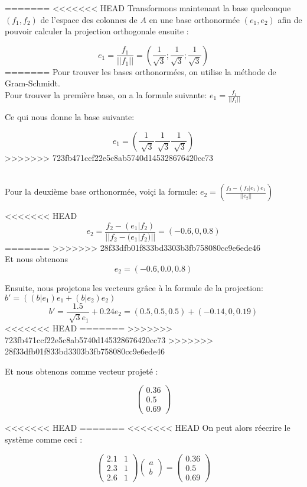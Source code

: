 =======
<<<<<<< HEAD
Transformons maintenant la base quelconque $(f_1, f_2)$ de l'espace des
colonnes de $A$ en une base orthonormée $(e_1, e_2)$ afin de pouvoir 
calculer la projection orthogonale ensuite :

$$e_1 = \frac{f_1}{||f_1||} = (\frac{1}{\sqrt{3}} ; \frac{1}{\sqrt{3}} ; \frac{1}{\sqrt{3}})$$
=======
Pour trouver les bases orthonormées, on utilise la méthode de Gram-Schmidt.
\\
Pour trouver la première base, on a la formule suivante: $e_1=\frac{f_1}{||f_1||}$

Ce qui nous donne la base suivante:

\[e_1=( \frac{1}{\sqrt[]{3}} \frac{1}{\sqrt[]{3}} \frac{1}{\sqrt[]{3}})\]
>>>>>>> 723fb471ccf22e5c8ab5740d145328676420cc73

\\ 
Pour la deuxième base orthonormée, voiçi la formule:  $e_2=(\frac{f_2-(f_2|e_1)e_1}{||e_2||})$

<<<<<<< HEAD
$$e_2 = \frac{f_2 - (e_1|f_2)}{||f_2 - (e_1|f_2)||} = (-0.6, 0, 0.8)$$
=======
>>>>>>> 28f33dfb01f833bd3303b3fb758080cc9e6ede46
\\Et nous obtenons
\[e_2=( -0.6, 0.0, 0.8)\]

\bigbreak
Ensuite, nous projetons les vecteurs grâce à la formule de la projection: $b'=((b|e_1)e_1+(b|e_2)e_2)$
\[b'=\frac{1.5}{\sqrt[]{3}e_1}+0.24e_2=(0.5,0.5,0.5)+(-0.14,0,0.19)\]
<<<<<<< HEAD
=======
>>>>>>> 723fb471ccf22e5c8ab5740d145328676420cc73
>>>>>>> 28f33dfb01f833bd3303b3fb758080cc9e6ede46

Et nous obtenons comme vecteur projeté :

$$
\begin{pmatrix}  
	0.36\\
	0.5\\
	0.69
\end{pmatrix}
$$

<<<<<<< HEAD
=======
<<<<<<< HEAD
On peut alors réecrire le système comme ceci :

$$
 \begin{pmatrix}  
  2.1 & 1\\
  2.3 & 1 \\
  2.6 & 1 
 \end{pmatrix}
 \begin{pmatrix}  
 a\\
 b
 \end{pmatrix}
 =
 \begin{pmatrix}  
 0.36\\
 0.5\\
 0.69
 \end{pmatrix}
$$

